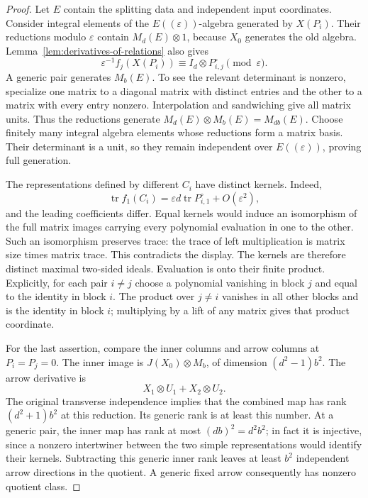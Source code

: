 \begin{proof}
Let $E$ contain the splitting data and independent input coordinates.
Consider integral elements of the $E((\varepsilon))$-algebra
generated by $X(P_i)$.  Their reductions modulo $\varepsilon$
contain $M_d(E)\otimes1$, because $X_0$ generates the old algebra.
Lemma~\ref{lem:derivatives-of-relations} also gives
\[
 \varepsilon^{-1}f_j(X(P_i))
 \equiv I_d\otimes P_{i,j}^{\circ}\pmod\varepsilon.
\]
A generic pair generates $M_b(E)$.  To see the relevant determinant
is nonzero, specialize one matrix to a diagonal matrix with distinct
entries and the other to a matrix with every entry nonzero.
Interpolation and sandwiching give all matrix units.  Thus the
reductions generate $M_d(E)\otimes M_b(E)=M_{db}(E)$.
Choose finitely many integral algebra elements whose reductions
form a matrix basis.  Their determinant is a unit, so they remain
independent over $E((\varepsilon))$, proving full generation.

The representations defined by different $C_i$ have distinct kernels.
Indeed,
\[
 \operatorname{tr}f_1(C_i)
  =\varepsilon d\operatorname{tr}P_{i,1}^{\circ}
    +O(\varepsilon^2),
\]
and the leading coefficients differ.  Equal kernels would induce an
isomorphism of the full matrix images carrying every polynomial
evaluation in one to the other.  Such an isomorphism preserves trace:
the trace of left multiplication is matrix size times matrix trace.
This contradicts the display.
The kernels are therefore distinct maximal two-sided ideals.
Evaluation is onto their finite product.  Explicitly, for each pair
$i\ne j$ choose a polynomial vanishing in block $j$ and equal to
the identity in block $i$.  The product over $j\ne i$ vanishes in
all other blocks and is the identity in block $i$; multiplying by
a lift of any matrix gives that product coordinate.

For the last assertion, compare the inner columns and arrow columns
at $P_i=P_j=0$.  The inner image is
$J(X_0)\otimes M_b$, of dimension $(d^2-1)b^2$.  The arrow derivative
is
\[
 X_1\otimes U_1+X_2\otimes U_2.
\]
The original transverse independence implies that the combined map
has rank $(d^2+1)b^2$ at this reduction.  Its generic rank is at
least this number.  At a generic pair, the inner map has rank at
most $(db)^2=d^2b^2$; in fact it is injective, since a nonzero
intertwiner between the two simple representations would identify
their kernels.  Subtracting this generic inner rank leaves at least
$b^2$ independent arrow directions in the quotient.  A generic
fixed arrow consequently has nonzero quotient class.
\end{proof}


